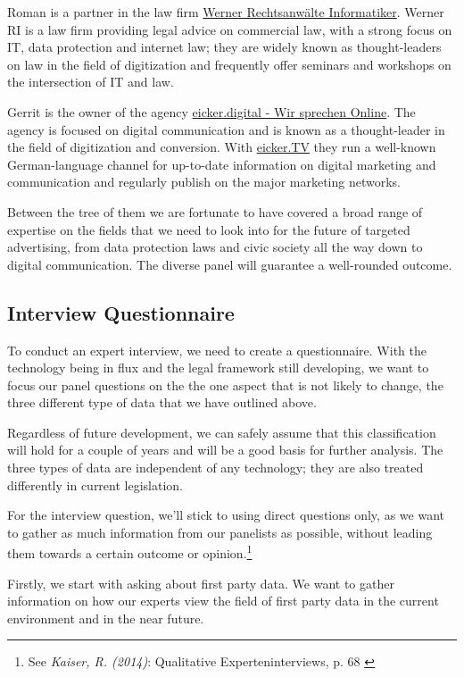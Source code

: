 Roman is a partner in the law firm \href{https://www.werner-ri.de/}{Werner Rechtsanwälte Informatiker}. Werner RI is a law firm providing legal advice on commercial law, with a strong focus on IT, data protection and internet law; they are widely known as thought-leaders on law in the field of digitization and frequently offer seminars and workshops on the intersection of IT and law.

Gerrit is the owner of the agency \href{https://eicker.digital/}{eicker.digital - Wir sprechen Online}. The agency is focused on digital communication and is known as a thought-leader in the field of digitization and conversion. With \href{https://www.youtube.com/eickertv}{eicker.TV} they run a well-known German-language channel for up-to-date information on digital marketing and communication and regularly publish on the major marketing networks.

Between the tree of them we are fortunate to have covered a broad range of expertise on the fields that we need to look into for the future of targeted advertising, from data protection laws and civic society all the way down to digital communication. The diverse panel will guarantee a well-rounded outcome.

\subsection{Interview Questionnaire}

To conduct an expert interview, we need to create a questionnaire. With the technology being in flux and the legal framework still developing, we want to focus our panel questions on the the one aspect that is not likely to change, the three different type of data that we have outlined above.

Regardless of future development, we can safely assume that this classification will hold for a couple of years and will be a good basis for further analysis. The three types of data are independent of any technology; they are also treated differently in current legislation.

For the interview question, we'll stick to using direct questions only, as we want to gather as much information from our panelists as possible, without leading them towards a certain outcome or opinion.\footnote{See \textit{Kaiser, R. (2014)}: Qualitative Experteninterviews, p. 68 \cite{expertInterviews}} 

Firstly, we start with asking about first party data. We want to gather information on how our experts view the field of first party data in the current environment and in the near future. 

